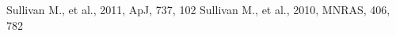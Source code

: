 \documentclass{article}
\begin{document}



\begin{thebibliography}{99}
 Sullivan M., et al., 2011, ApJ, 737, 102 
 Sullivan M., et al., 2010, MNRAS, 406, 782 

\end{thebibliography}
\end{document}
